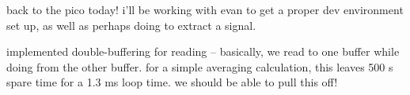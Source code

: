 back to the pico today! i'll be working with evan to get a proper dev
environment set up, as well as perhaps doing \dsp to extract a signal.

implemented double-buffering for \adc reading -- basically, we read to one
buffer while doing \dsp from the other buffer. for a simple averaging
calculation, this leaves 500 \textmu s spare time for a 1.3 ms loop time. we
should be able to pull this off!
